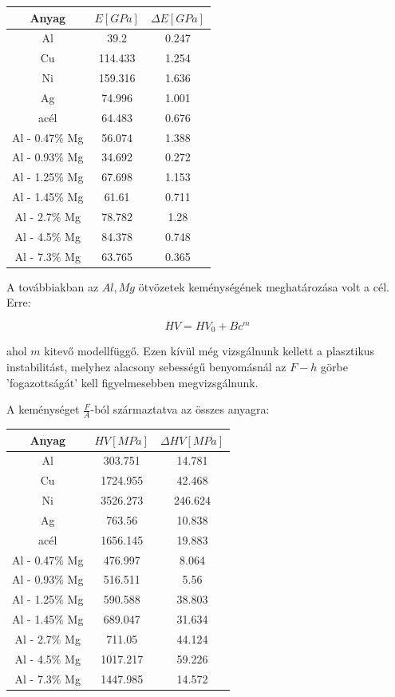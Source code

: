 \documentclass[a4paper,12pt]{article}
\begin{document}
\begin{center}
\begin{tabular}{|c|c|c|}
\hline
Anyag & $E [GPa]$ & $\Delta E [GPa]$ \\
\hline
Al &39.2 & 0.247\\
\hline
Cu &114.433  &1.254\\
\hline
Ni &159.316 &1.636\\
\hline
Ag &74.996 &1.001\\
\hline
acél &64.483 & 0.676\\
\hline
Al - 0.47$\%$ Mg &56.074 & 1.388\\
\hline
Al - 0.93$\%$ Mg &34.692 & 0.272\\
\hline
Al - 1.25$\%$ Mg &67.698 & 1.153\\
\hline
Al - 1.45$\%$ Mg & 61.61 & 0.711\\
\hline
Al - 2.7$\%$ Mg & 78.782 & 1.28\\
\hline
Al - 4.5$\%$ Mg & 84.378 & 0.748\\
\hline
Al - 7.3$\%$ Mg & 63.765 & 0.365\\
\hline
\end{tabular}
\end{center}

\par A továbbiakban az $Al, Mg$ ötvözetek keménységének meghatározása volt a cél. Erre:

\begin{equation*}
HV = HV_{0} + Bc^{m}
\end{equation*}

\par ahol $m$ kitevő modellfüggő. Ezen kívül még vizsgálnunk kellett a plasztikus instabilitást, melyhez alacsony sebességű benyomásnál az $F-h$ görbe 'fogazottságát' kell figyelmesebben megvizsgálnunk. 

\par A keménységet $\frac{F}{A}$-ból származtatva az összes anyagra:

\begin{center}
\begin{tabular}{|c|c|c|}
\hline
Anyag & $HV [MPa]$ & $\Delta HV [MPa]$ \\
\hline
Al &303.751 &14.781 \\
\hline
Cu &1724.955 &42.468 \\
\hline
Ni &3526.273 &246.624 \\
\hline
Ag &763.56 &10.838 \\
\hline
acél& 1656.145 &19.883 \\
\hline
Al - 0.47$\%$ Mg & 476.997 & 8.064 \\
\hline
Al - 0.93$\%$ Mg & 516.511 & 5.56 \\
\hline
Al - 1.25$\%$ Mg & 590.588 & 38.803 \\
\hline
Al - 1.45$\%$ Mg & 689.047 & 31.634 \\
\hline
Al - 2.7$\%$ Mg & 711.05 & 44.124 \\
\hline
Al - 4.5$\%$ Mg & 1017.217 & 59.226 \\
\hline
Al - 7.3$\%$ Mg & 1447.985 & 14.572 \\
\hline
\end{tabular}
\end{center}
\end{document}

